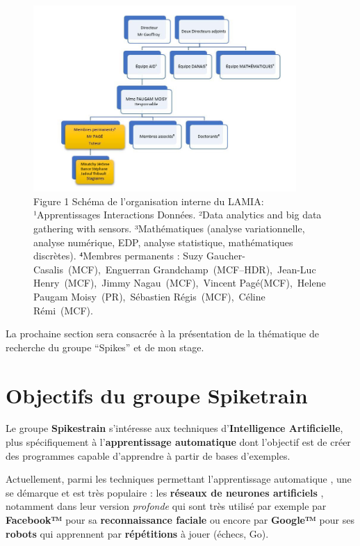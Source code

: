 \begin{figure}[h!]
\centering
\includegraphics[width=10cm]{./images/orga.jpg}
\caption{Figure 1 Schéma de l'organisation interne du LAMIA:
¹Apprentissages Interactions Données. ²Data analytics and big data
gathering with sensors. ³Mathématiques (analyse variationnelle, analyse
numérique, EDP, analyse statistique, mathématiques discrètes). ⁴Membres
permanents : Suzy Gaucher-Casalis~(MCF),~Enguerran
Grandchamp~(MCF--HDR),~Jean-Luc Henry~(MCF),~Jimmy Nagau~(MCF),~Vincent
Pagé(MCF),~Helene Paugam Moisy~(PR),~Sébastien Régis~(MCF),~Céline
Rémi~(MCF).}
\end{figure}

La prochaine section sera consacrée à la présentation de la thématique
de recherche du groupe ``Spikes'' et de mon stage.


\hypertarget{Objectif_Spike}{%
\section{Objectifs du groupe Spiketrain}\label{Objectif_Spiketrain}}

Le groupe \textbf{Spikestrain} s'intéresse aux techniques
d'\textbf{Intelligence Artificielle}, plus spécifiquement à
l'\textbf{apprentissage automatique} dont l'objectif est de créer des
programmes capable d'apprendre à partir de bases d'exemples.

Actuellement, parmi les techniques permettant l'apprentissage
automatique , une se démarque et est très populaire : les
\textbf{réseaux de neurones artificiels} , notamment dans leur version
\emph{profonde} qui sont très utilisé par exemple par \textbf{Facebook™}
pour sa \textbf{reconnaissance faciale} ou encore par \textbf{Google™}
pour ses \textbf{robots} qui apprennent par \textbf{répétitions} à jouer
(échecs, Go).


\hypertarget{problematique}{%
\label{Problematique}}

